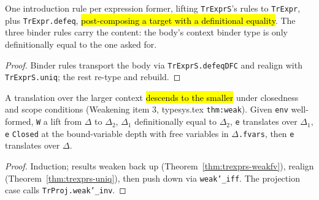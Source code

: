 \begin{lemma}
\label{family:trexpr-builders}
\leanok
{}
 

 One introduction rule per expression former, lifting \texttt{TrExprS}'s rules to \texttt{TrExpr}, plus \texttt{TrExpr.defeq}, \hl{post-composing a target with a definitional equality}. The three binder rules carry the content: the body's context binder type is only definitionally equal to the one asked for.
\end{lemma}
\begin{proof}
\leanok
{} Binder rules transport the body via \texttt{TrExprS.defeqDFC} and realign with \texttt{TrExprS.uniq}; the rest re-type and rebuild.
\end{proof}

\begin{theorem}
\label{thm:trexprs-weakfv-inv}
\leanok
{}
 A translation over the larger context \hl{descends to the smaller} under closedness and scope conditions (Weakening item 3, typesys.tex \texttt{thm:weak}). Given \texttt{env} well-formed, \texttt{W} a lift from $\Delta$ to $\Delta_2$, $\Delta_1$ definitionally equal to $\Delta_2$, \texttt{e} translates over $\Delta_1$, \texttt{e} \texttt{Closed} at the bound-variable depth with free variables in $\Delta$\texttt{.fvars}, then \texttt{e} translates over $\Delta$.
\end{theorem}
\begin{proof}
\leanok
{} Induction; results weaken back up (Theorem~\ref{thm:trexprs-weakfv}), realign (Theorem~\ref{thm:trexprs-uniq}), then push down via \texttt{weak'\_iff}. The projection case calls \texttt{TrProj.weak'\_inv}.
\end{proof}

